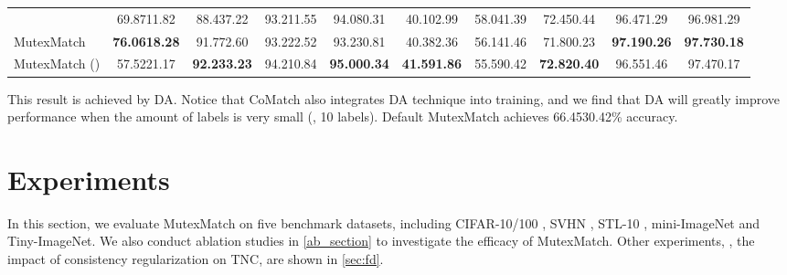 \documentclass[lettersize,journal]{IEEEtran}
\theoremstyle{plain}
\theoremstyle{definition}
\theoremstyle{remark}
\begin{document}
\begin{table*}[t]
{\begin{threeparttable}
\begin{tabular}{@{}lccccccccc@{}}
              & \colorbox{light-gray-2}{69.8711.82}                     & 88.437.22  & 93.211.55                    & 94.080.31         & 40.102.99            & \colorbox{light-gray-2}{58.041.39}             & 72.450.44              & 96.471.29           & 96.981.29           \\ \cmidrule(r){1-1} \cmidrule(lr){2-5}  \cmidrule(lr){6-8}  \cmidrule(lr){9-10}  
      MutexMatch              & \textbf{76.0618.28}\tnote{1}         & \colorbox{light-gray-2}{91.772.60}            & 93.222.52           & 93.230.81       & \colorbox{light-gray-2}{40.382.36}     & 56.141.46            & 71.800.23            & \textbf{97.190.26}           & \textbf{97.730.18}          \\
      MutexMatch ()             & 57.5221.17            & \textbf{92.233.23}             & \colorbox{light-gray-2}{94.210.84}           & \textbf{95.000.34}       & \textbf{41.591.86}     & 55.590.42             & \textbf{72.820.40}            & 96.551.46           & \colorbox{light-gray-2}{97.470.17}          \\ \bottomrule
      \end{tabular}
      \begin{tablenotes}
        \footnotesize
        \item[1] This result is achieved by DA. Notice that CoMatch also integrates DA technique into training, and we find that DA will greatly improve performance when the amount of labels is very small (\eg, 10 labels). Default MutexMatch achieves 66.4530.42\% accuracy. 
\end{tablenotes}
   \end{threeparttable}
   }
    \vskip 0in
\end{table*}

\section{Experiments}
\label{exp}

In this section, we evaluate MutexMatch on five benchmark datasets, including  CIFAR-10/100 \cite{krizhevsky2009learning}, SVHN \cite{netzer2011reading}, STL-10 \cite{coates2011an}, mini-ImageNet \cite{vinyals2016matching} and Tiny-ImageNet.
We also conduct ablation studies  in \cref{ab_section} to investigate the efficacy of MutexMatch. Other experiments, \eg, the impact of consistency regularization on TNC, are shown  in \cref{sec:fd}.
\end{document}

